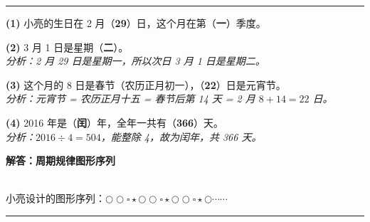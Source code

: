 \documentclass[12pt, a4paper]{ctexart}
\begin{document}
\vspace{0.5cm}

\vspace{0.8cm}
\hrule
\vspace{0.5cm}

{\small
\textbf{(1)} 小亮的生日在 2 月（\textbf{29}）日，这个月在第（\textbf{一}）季度。

\vspace{0.3cm}
\textbf{(2)} 3 月 1 日是星期（\textbf{二}）。\\
\textit{分析：2 月 29 日是星期一，所以次日 3 月 1 日是星期二。}

\vspace{0.3cm}
\textbf{(3)} 这个月的 8 日是春节（农历正月初一），（\textbf{22}）日是元宵节。\\
\textit{分析：元宵节 = 农历正月十五 = 春节后第 14 天 = 2 月 $8 + 14 = 22$ 日。}

\vspace{0.3cm}
\textbf{(4)} 2016 年是（\textbf{闰}）年，全年一共有（\textbf{366}）天。\\
\textit{分析：$2016 \div 4 = 504$，能整除 4，故为闰年，共 366 天。}
}


\newpage

\begin{center}
  {\large\bfseries 解答：周期规律图形序列}
\end{center}

\vspace{0.6cm}

\\
{\small 小亮设计的图形序列：$\bigcirc \bigcirc \square \star \bigcirc \bigcirc \square \star \bigcirc \bigcirc \square \star \bigcirc \cdots\cdots$}

\vspace{0.8cm}
\hrule
\vspace{0.5cm}
\end{document}
